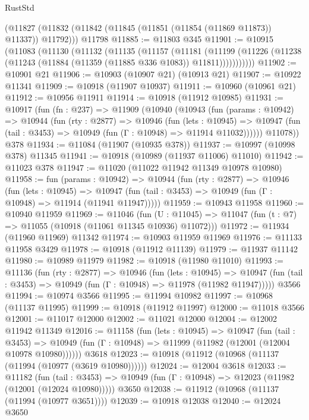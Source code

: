 \begin{lexlean}{RustStd}
\begin{coremodule}
{{{{{{{{{{{{{{{{{{{    (@11827 (@11832 (@11842 (@11845 (@11851 (@11854 (@11869 @11873)) @11337)) @11792)))
    @11798
@11885 := @11803 @345
@11901 := @10915
    (@11083
      (@11130
        (@11132
          (@11135
            (@11157
              (@11181
                (@11199
                  (@11226 (@11238 (@11243 (@11884 (@11359 (@11885 @336 @1083)) @11811)))))))))))
@11902 := @10901 @21
@11906 := @10903 (@10907 @21) (@10913 @21)
@11907 := @10922 @11341
@11909 := @10918 (@11907 @10937)
@11911 := @10960 (@10961 @21)
@11912 := @10956 @11911
@11914 := @10918 (@11912 @10985)
@11931 := @10917
    (fun (fn : @237) =>
    @11909
      (@10940
        (@10943
          (fun (params : @10942) =>
          @10944
            (fun (rty : @2877) =>
            @10946
              (fun (lets : @10945) =>
              @10947 (fun (tail : @3453) => @10949 (fun (Γ : @10948) => @11914 @11032))))))
        @11078))
    @378
@11934 := @11084 (@11907 (@10935 @378))
@11937 := @10997 (@10998 @378) @11345
@11941 := @10918 (@10989 (@11937 @11006) @11010)
@11942 := @11023 @378
@11947 := @11020 (@11022 @11942 @11349 @10978 @10980)
@11958 := fun (params : @10942) =>
  @10944
    (fun (rty : @2877) =>
    @10946
      (fun (lets : @10945) =>
      @10947 (fun (tail : @3453) => @10949 (fun (Γ : @10948) => @11914 (@11941 @11947)))))
@11959 := @10943 @11958
@11960 := @10940 @11959
@11969 := @11046
    (fun (U : @11045) => @11047 (fun (t : @7) => @11055 (@10918 (@11061 @11345 @10936) @11072)))
@11972 := @11934 (@11960 @11969) @11342
@11974 := @10903 @11959 @11969
@11976 := @11133 @11958 @3429
@11978 := @10918 (@11912 @11139)
@11979 := @11937 @11142
@11980 := @10989 @11979
@11982 := @10918 (@11980 @11010)
@11993 := @11136
    (fun (rty : @2877) =>
    @10946
      (fun (lets : @10945) =>
      @10947 (fun (tail : @3453) => @10949 (fun (Γ : @10948) => @11978 (@11982 @11947)))))
    @3566
@11994 := @10974 @3566
@11995 := @11994 @10982
@11997 := @10968 (@11137 @11995)
@11999 := @10918 (@11912 @11997)
@12000 := @11018 @3566
@12001 := @11017 @12000
@12002 := @11021 @12000
@12004 := @12002 @11942 @11349
@12016 := @11158
    (fun (lets : @10945) =>
    @10947
      (fun (tail : @3453) =>
      @10949 (fun (Γ : @10948) => @11999 (@11982 (@12001 (@12004 @10978 @10980))))))
    @3618
@12023 := @10918 (@11912 (@10968 (@11137 (@11994 (@10977 (@3619 @10980))))))
@12024 := @12004 @3618
@12033 := @11182
    (fun (tail : @3453) => @10949 (fun (Γ : @10948) => @12023 (@11982 (@12001 (@12024 @10980)))))
    @3650
@12038 := @11912 (@10968 (@11137 (@11994 (@10977 @3651))))
@12039 := @10918 @12038
@12040 := @12024 @3650
}}}}}}}}}}}}}}}}}}}
\end{coremodule}
\end{lexlean}

